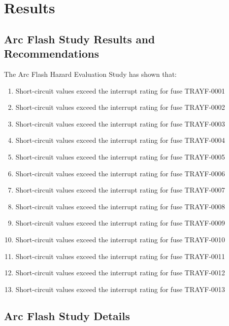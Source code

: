 
\section{Results}
\label{af:results}

\subsection{Arc Flash Study Results and Recommendations}
\label{af:results:afrr}

The Arc Flash Hazard Evaluation Study has shown that:
\begin{enumerate}
	\item Short-circuit values exceed the interrupt rating for fuse TRAYF-0001
	\item Short-circuit values exceed the interrupt rating for fuse TRAYF-0002
	\item Short-circuit values exceed the interrupt rating for fuse TRAYF-0003
	\item Short-circuit values exceed the interrupt rating for fuse TRAYF-0004
	\item Short-circuit values exceed the interrupt rating for fuse TRAYF-0005
	\item Short-circuit values exceed the interrupt rating for fuse TRAYF-0006
	\item Short-circuit values exceed the interrupt rating for fuse TRAYF-0007
	\item Short-circuit values exceed the interrupt rating for fuse TRAYF-0008
	\item Short-circuit values exceed the interrupt rating for fuse TRAYF-0009
	\item Short-circuit values exceed the interrupt rating for fuse TRAYF-0010
	\item Short-circuit values exceed the interrupt rating for fuse TRAYF-0011
	\item Short-circuit values exceed the interrupt rating for fuse TRAYF-0012
	\item Short-circuit values exceed the interrupt rating for fuse TRAYF-0013
\end{enumerate}

\pagebreak

\subsection{Arc Flash Study Details}
\label{af:results:afsd}

